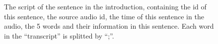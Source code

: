 \begin{figure}[th]
\centering
{}
\caption{The script of the sentence in the introduction, containing the id of this sentence, the source audio id, the time of this sentence in the audio, the 5 words and their information in this sentence. Each word in the ``transcript'' is splitted by ``;''.}
\label{fig:dataonesample}
\end{figure}

